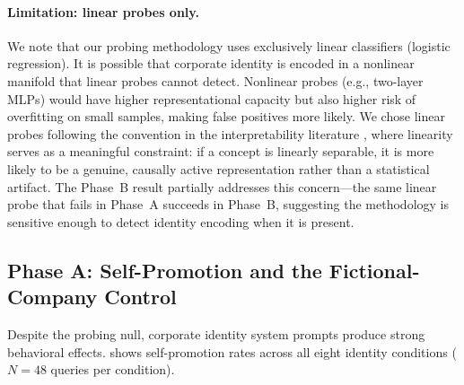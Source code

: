 \documentclass[11pt,a4paper]{article}
\begin{document}
\paragraph{Limitation: linear probes only.} We note that our probing
methodology uses exclusively linear classifiers (logistic regression). It is
possible that corporate identity is encoded in a nonlinear manifold that linear
probes cannot detect. Nonlinear probes (e.g., two-layer MLPs) would have higher
representational capacity but also higher risk of overfitting on small samples,
making false positives more likely. We chose linear probes following the
convention in the interpretability literature \citep{marks2023geometry,
goldowsky2023localizing}, where linearity serves as a meaningful constraint: if a
concept is linearly separable, it is more likely to be a genuine, causally
active representation rather than a statistical artifact. The Phase~B result
partially addresses this concern---the same linear probe that fails in Phase~A
succeeds in Phase~B, suggesting the methodology is sensitive enough to detect
identity encoding when it is present.

\subsection{Phase A: Self-Promotion and the Fictional-Company Control}
\label{sec:phase_a_selfpromo}

Despite the probing null, corporate identity system prompts produce strong
behavioral effects.  shows self-promotion rates across all
eight identity conditions ($N = 48$ queries per condition).
\end{document}
